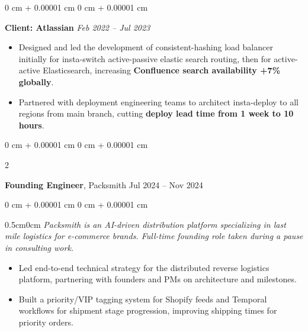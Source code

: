 \documentclass[10pt, letterpaper]{article}
\newenvironment{highlights}{
    \begin{itemize}[
        topsep=0.10 cm,
        parsep=0.10 cm,
        partopsep=0pt,
        itemsep=0pt,
        leftmargin=0 cm + 10pt
    ]
}{
    \end{itemize}
} %
\newenvironment{onecolentry}{
    \begin{adjustwidth}{
        0 cm + 0.00001 cm
    }{
        0 cm + 0.00001 cm
    }
}{
    \end{adjustwidth}
} %
\newenvironment{twocolentry}[2][]{
    \onecolentry
    \def\secondColumn{#2}
    \setcolumnwidth{\fill, 4.5 cm}
    \begin{paracol}{2}
}{
    \switchcolumn \raggedleft \secondColumn
    \end{paracol}
    \endonecolentry
} %
\begin{document}
\begin{onecolentry}
            \vspace{0.10 cm}
            \hspace{0.5cm}\textbf{Client: Atlassian} \hfill \textit{Feb 2022 -- Jul 2023}
            \begin{itemize}[
                topsep=0.10 cm,
                parsep=0.10 cm,
                partopsep=0pt,
                itemsep=0pt,
                leftmargin=0 cm + 10pt + 0.5cm
            ]
                \item Designed and led the development of consistent-hashing load balancer initially for insta-switch active-passive elastic search routing, then for active-active Elasticsearch, increasing \textbf{Confluence search availability +7\% globally}.
                \item Partnered with deployment engineering teams to architect insta-deploy to all regions from main branch, cutting \textbf{deploy lead time from 1 week to 10 hours}.
            \end{itemize}
        \end{onecolentry}

        \vspace{0.15 cm}
        \begin{twocolentry}{
            Jul 2024 – Nov 2024
        }
        \textbf{Founding Engineer}, Packsmith\end{twocolentry}
        \vspace{0.10 cm}
        \begin{onecolentry}
            \begin{adjustwidth}{0.5cm}{0cm}
            \textit{Packsmith is an AI-driven distribution platform specializing in last mile logistics for e-commerce brands. Full-time founding role taken during a pause in consulting work.}
            \end{adjustwidth}

            \vspace{0.10 cm}
            \begin{highlights}
                \item Led end-to-end technical strategy for the distributed reverse logistics platform, partnering with founders and PMs on architecture and milestones.
                \item Built a priority/VIP tagging system for Shopify feeds and Temporal workflows for shipment stage progression, improving shipping times for priority orders.
            \end{highlights}
        \end{onecolentry}
\end{document}
